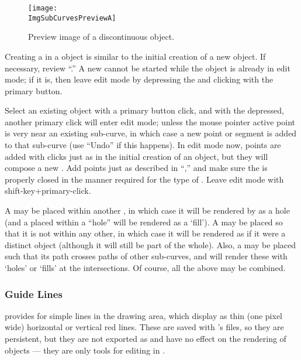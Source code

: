 			\begin{figure}[htb!]
			\centering
			\texttt{[image: \\ImgSubCurvesPreviewA]}
			\caption{Preview image of a discontinuous object.}
			\label{fig:subcurves_1}
			\end{figure}
			
			Creating a  in a
			\IXspline{} object is similar
			to the initial creation of a new \IXspline{} object.
			If necessary, review
			``.''
			A new  cannot be started while
			the object is already in edit mode; if it is,
			then leave edit mode by depressing the 
			 and clicking with the primary button.
			
			Select an existing object with a primary button
			click, and with the  
			depressed, another primary click will enter
			edit mode; unless the mouse pointer active point
			is very near an existing sub-curve, in which
			case a new point or segment is added to that
			sub-curve (use ``Undo'' if this happens).
			In edit mode now, points are added with clicks
			just as in the initial creation of an object,
			but they will compose a new .
			Add points just as described in
			``,'' and make
			sure the  is properly closed
			in the manner required for the type of \IXspline{}.
			Leave edit mode with shift-key+primary-click.
			
			A  may be placed within another
			, in which case it will be
			rendered by \IXpov{} as a hole (and a
			 placed within a ``hole''
			will be rendered as a `fill').
			A  may be placed so that it
			is not within any other, in which case it will be
			rendered as if it were a distinct object
			(although it will still be part of the whole).
			Also, a  may be placed such
			that its path crosses paths of other sub-curves,
			and \IXpov{} will render these with `holes'
			or `fills' at the intersections. Of course,
			all the above may be combined.

			\subsubsection{Guide Lines}%
			\label{sssec:guide_lines}
			\IXpkgu{} provides for simple  lines
			in the drawing area, which display as thin
			(one pixel wide) horizontal or vertical
			red lines. These are saved with \IXpkg{}'s
			files, so they are persistent, but they are
			not exported as  and have no effect
			on the rendering of objects --- they are only
			tools for editing in \IXpkg{}.
			

